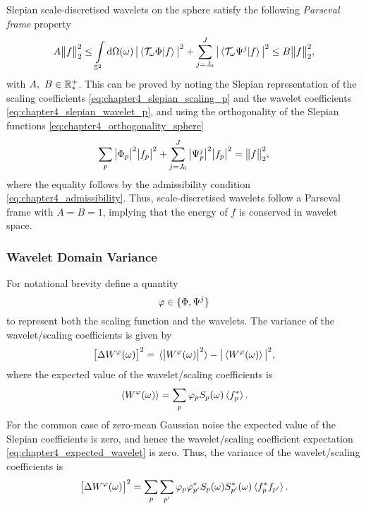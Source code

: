 Slepian scale-discretised wavelets on the sphere satisfy the following \emph{Parseval frame} property
%
\begin{equation}
	A\norm{f}^{2} \leq \integrateSphere{\omega}
	\abs{\braket*{\translation{\omega}\Phi}{f}}^{2}
	+ \waveletSum \abs{\braket*{\translation{\omega}\Psi^{j}}{f}}^{2}
	\leq B\norm{f}^{2},
\end{equation}
%
with \(A,\ B \in \realPosParam{}\).
This can be proved by noting the Slepian representation of the scaling coefficients \cref{eq:chapter4_slepian_scaling_p} and the wavelet coefficients \cref{eq:chapter4_slepian_wavelet_p}, and using the orthogonality of the Slepian functions \cref{eq:chapter4_orthogonality_sphere}
%
\begin{equation}
	\slepianSum \abs{\slepian{\Phi}}^{2} \abs{\slepian{f}}^{2}
	+ \waveletSum \abs{\slepian{\Psi}^{j}}^{2} \abs{\slepian{f}}^{2}
	= \norm{f}^{2},
\end{equation}
%
where the equality follows by the admissibility condition \cref{eq:chapter4_admissibility}.
Thus, scale-discretised wavelets follow a Parseval frame with \(A = B = 1\), implying that the energy of \(f\) is conserved in wavelet space.

\subsubsection{Wavelet Domain Variance}

For notational brevity define a quantity
%
\begin{equation}\label{eq:chapter4_scaling_and_wavelet}
	\varphi \in \set{\Phi,\Psi^{j}}
\end{equation}
%
to represent both the scaling function and the wavelets.
The variance of the wavelet/scaling coefficients is given by
%
\begin{equation}
	\variance{\pixel{W^{\varphi}}}
	= \expval*{\abs{\pixel{W^{\varphi}}}^{2}}
	-\abs{\expval*{\pixel{W^{\varphi}}}}^{2},
\end{equation}
%
where the expected value of the wavelet/scaling coefficients is
%
\begin{equation}\label{eq:chapter4_expected_wavelet}
	\expval*{\pixel{W^{\varphi}}}
	= \slepianSum \slepian{\varphi} \pixel{\slepian{S}} \expval*{\conj{\slepian{f}}}.
\end{equation}
%
For the common case of zero-mean Gaussian noise the expected value of the Slepian coefficients is zero, and hence the wavelet/scaling coefficient expectation \cref{eq:chapter4_expected_wavelet} is zero.
Thus, the variance of the wavelet/scaling coefficients is
%
\begin{equation}\label{eq:chapter4_slepian_isotropic_noise}
	\variance{\pixel{W^{\varphi}}}
	= \slepianSum \slepianSum['] \slepian{\varphi} \conj{\slepian[']{\varphi}} \pixel{\slepian{S}} \pixel{\conj{\slepian[']{S}}} \expval*{\conj{\slepian{f}} \slepian[']{f}}.
\end{equation}

